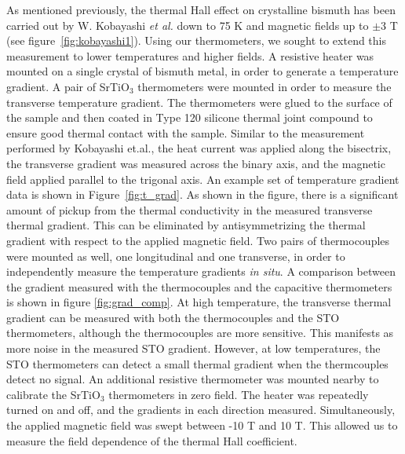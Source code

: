 \documentclass{thesis-umich}
\begin{document}
As mentioned previously, the thermal Hall effect on crystalline bismuth has been carried out by W.
Kobayashi \textit{et al.}\cite{Kobayashi2012} down to 75 K and magnetic fields up
to $\pm$3 T (see figure~\ref{fig:kobayashi1}). Using our thermometers, we sought to extend this measurement to
lower temperatures and higher fields. A resistive heater was mounted on a single
crystal of bismuth metal, in order to generate a temperature gradient. A pair of
SrTiO$_3$ thermometers were mounted in order to measure the transverse
temperature gradient. The thermometers were glued to the surface of the sample
and then coated in Type 120 silicone thermal joint compound to ensure good
thermal contact with the sample. Similar to the measurement performed by Kobayashi et.al., the heat current was applied along the bisectrix, the transverse gradient was measured across the binary axis, and the magnetic field applied parallel to the trigonal axis. An example set of temperature gradient data is
shown in Figure~\ref{fig:t_grad}. As shown in the figure, there is a significant amount of pickup from the thermal conductivity in the measured transverse thermal gradient. This can be eliminated by antisymmetrizing the thermal gradient with respect to the applied magnetic field. Two pairs of thermocouples were mounted as well,
one longitudinal and one transverse, in order to independently measure the
temperature gradients \textit{in situ}. A comparison between the gradient measured with the thermocouples and the capacitive thermometers is shown in figure \ref{fig:grad_comp}. At high temperature, the transverse thermal gradient can be measured with both the thermocouples and the STO thermometers, although the thermocouples are more sensitive. This manifests as more noise in the measured STO gradient. However, at low temperatures, the STO thermometers can detect a small thermal gradient when the thermcouples detect no signal. An additional resistive thermometer was
mounted nearby to calibrate the SrTiO$_3$ thermometers in zero field.  The
heater was repeatedly turned on and off, and the gradients in each direction
measured. Simultaneously, the applied magnetic field was swept between -10 T and
10 T. This allowed us to measure the field dependence of the thermal Hall
coefficient.
\end{document}
